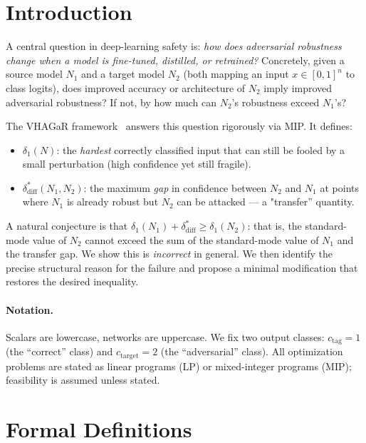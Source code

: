 \documentclass[12pt]{article}
\theoremstyle{definition}
\theoremstyle{plain}
\theoremstyle{remark}
\begin{document}
\section{Introduction}

A central question in deep-learning safety is: \emph{how does
adversarial robustness change when a model is fine-tuned, distilled,
or retrained?} Concretely, given a source model $N_1$ and a target
model $N_2$ (both mapping an input $x\in[0,1]^n$ to class logits),
does improved accuracy or architecture of $N_2$ imply improved
adversarial robustness? If not, by how much can $N_2$'s robustness
exceed $N_1$'s?

The VHAGaR framework~\cite{vaghar} answers this question rigorously via
MIP. It defines:
\begin{itemize}
  \item $\delta_1(N)$: the \emph{hardest} correctly classified input
        that can still be fooled by a small perturbation (high confidence
        yet still fragile).
  \item $\delta_{\mathrm{diff}}^*(N_1,N_2)$: the maximum \emph{gap} in
        confidence between $N_2$ and $N_1$ at points where $N_1$ is
        already robust but $N_2$ can be attacked — a "transfer'' quantity.
\end{itemize}

A natural conjecture is that
$\delta_1(N_1)+\delta_{\mathrm{diff}}^*\geq\delta_1(N_2)$:
that is, the standard-mode value of $N_2$ cannot exceed the sum of the
standard-mode value of $N_1$ and the transfer gap. We show this is
\emph{incorrect} in general. We then identify the precise structural
reason for the failure and propose a minimal modification that restores
the desired inequality.

\paragraph{Notation.}
Scalars are lowercase, networks are uppercase. We fix two output classes:
$c_\mathrm{tag}=1$ (the ``correct'' class) and
$c_\mathrm{target}=2$ (the ``adversarial'' class).
All optimization problems are stated as linear programs (LP) or
mixed-integer programs (MIP); feasibility is assumed unless stated.

\section{Formal Definitions}\label{sec:defs}
\end{document}
